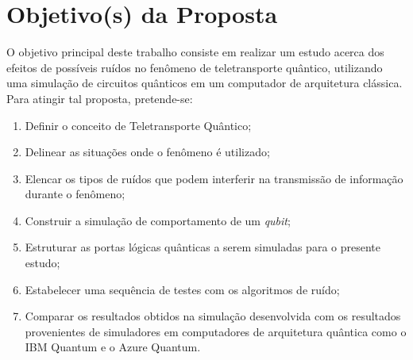 \documentclass[11pt,oneside,brazil,hidelinks,article,sumario=tradicional,a4paper]{abntex2}
\begin{document}

\section{Objetivo(s) da Proposta}\label{sec:objs}

O objetivo principal deste trabalho consiste em realizar um estudo acerca dos efeitos de possíveis ruídos no fenômeno de teletransporte quântico, utilizando uma simulação de circuitos quânticos em um computador de arquitetura clássica. Para atingir tal proposta, pretende-se:
\begin{enumerate}
\item Definir o conceito de Teletransporte Quântico;
\item Delinear as situações onde o fenômeno é utilizado;
\item Elencar os tipos de ruídos que podem interferir na transmissão de informação durante o fenômeno;
\item Construir a simulação de comportamento de um \textit{qubit};
\item Estruturar as portas lógicas quânticas a serem simuladas para o presente estudo;
\item Estabelecer uma sequência de testes com os algoritmos de ruído;
\item Comparar os resultados obtidos na simulação desenvolvida com os resultados provenientes de simuladores em computadores de arquitetura quântica como o IBM Quantum e o Azure Quantum.
\end{enumerate} 
\end{document}
